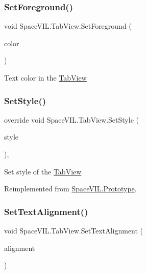 \subsubsection{\texorpdfstring{Set\+Foreground()}{SetForeground()}}
{\footnotesize\ttfamily void Space\+V\+I\+L.\+Tab\+View.\+Set\+Foreground (\begin{DoxyParamCaption}\item[{Color}]{color }\end{DoxyParamCaption})\hspace{0.3cm}{\ttfamily [inline]}}



Text color in the \mbox{\hyperlink{class_space_v_i_l_1_1_tab_view}{Tab\+View}} 

\mbox{\label{class_space_v_i_l_1_1_tab_view_a02e2484cd3a31eb4d794a138981e3fa7}} 
\subsubsection{\texorpdfstring{Set\+Style()}{SetStyle()}}
{\footnotesize\ttfamily override void Space\+V\+I\+L.\+Tab\+View.\+Set\+Style (\begin{DoxyParamCaption}\item[{\mbox{\hyperlink{class_space_v_i_l_1_1_decorations_1_1_style}{Style}}}]{style }\end{DoxyParamCaption})\hspace{0.3cm}{\ttfamily [inline]}, {\ttfamily [virtual]}}



Set style of the \mbox{\hyperlink{class_space_v_i_l_1_1_tab_view}{Tab\+View}} 



Reimplemented from \mbox{\hyperlink{class_space_v_i_l_1_1_prototype_ae96644a6ace490afb376fb542161e541}{Space\+V\+I\+L.\+Prototype}}.

\mbox{\label{class_space_v_i_l_1_1_tab_view_abdd2253b42ef61e32efb3115c679bbc5}} 
\subsubsection{\texorpdfstring{Set\+Text\+Alignment()}{SetTextAlignment()}}
{\footnotesize\ttfamily void Space\+V\+I\+L.\+Tab\+View.\+Set\+Text\+Alignment (\begin{DoxyParamCaption}\item[{Item\+Alignment}]{alignment }\end{DoxyParamCaption})\hspace{0.3cm}{\ttfamily [inline]}}



